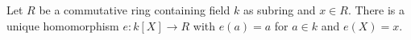 Let $R$ be a commutative ring containing field $k$ as subring and $x \in R$. There is a unique homomorphism $e: k[X] \to R$ with $e(a)=a$ for $a \in k$ and $e(X)=x$.

